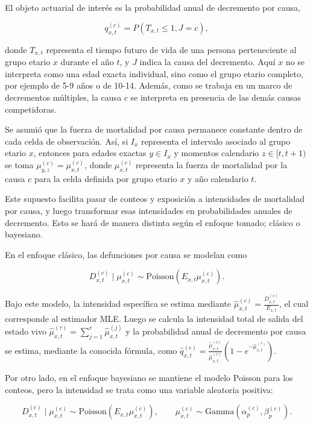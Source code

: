 \documentclass[
  spanish,
  letterpaper,
  DIV=11,
  numbers=noendperiod]{scrartcl}
\begin{document}
El objeto actuarial de interés es la probabilidad anual de decremento
por causa,

\[q_{x,t}^{(c)} = P(T_{x,t}\leq 1, J=c),\]

donde \(T_{x,t}\) representa el tiempo futuro de vida de una persona
perteneciente al grupo etario \(x\) durante el año \(t\), y \(J\) indica
la causa del decremento. Aquí \(x\) no se interpreta como una edad
exacta individual, sino como el grupo etario completo, por ejemplo de
5-9 años o de 10-14. Además, como se trabaja en un marco de decrementos
múltiples, la causa \(c\) se interpreta en presencia de las demás causas
competidoras.

Se asumió que la fuerza de mortalidad por causa permanece constante
dentro de cada celda de observación. Así, si \(I_x\) representa el
intervalo asociado al grupo etario \(x\), entonces para edades exactas
\(y\in I_x\) y momentos calendario \(z\in[t,t+1)\) se toma
\(\mu_{y,z}^{(c)}=\mu_{x,t}^{(c)}\), donde \(\mu_{x,t}^{(c)}\)
representa la fuerza de mortalidad por la causa \(c\) para la celda
definida por grupo etario \(x\) y año calendario \(t\).

Este supuesto facilita pasar de conteos y exposición a intensidades de
mortalidad por causa, y luego transformar esas intensidades en
probabilidades anuales de decremento. Esto se hará de manera distinta
según el enfoque tomado; clásico o bayesiano.

En el enfoque clásico, las defunciones por causa se modelan como

\[D_{x,t}^{(c)}\mid \mu_{x,t}^{(c)}
\sim
\text{Poisson}(E_{x,t}\mu_{x,t}^{(c)}).\]

Bajo este modelo, la intensidad específica se estima mediante
\(\widehat{\mu}_{x,t}^{(c)}=\frac{D_{x,t}^{(c)}}{E_{x,t}}\), el cual
corresponde al estimador MLE. Luego se calcula la intensidad total de
salida del estado vivo
\(\widehat{\mu}_{x,t}^{(\tau)}=\sum_{j=1}^{r}\widehat{\mu}_{x,t}^{(j)}\)
y la probabilidad anual de decremento por causa se estima, mediante la
conocida fórmula, como
\(\widehat{q}_{x,t}^{(c)} = \frac{\widehat{\mu}_{x,t}^{(c)}}{\widehat{\mu}_{x,t}^{(\tau)}} \left(1-e^{-\widehat{\mu}_{x,t}^{(\tau)}}\right).\)

Por otro lado, en el enfoque bayesiano se mantiene el modelo Poisson
para los conteos, pero la intensidad se trata como una variable
aleatoria positiva:

\[D_{x,t}^{(c)}\mid \mu_{x,t}^{(c)}
\sim
\text{Poisson}(E_{x,t}\mu_{x,t}^{(c)}),
\qquad
\mu_{x,t}^{(c)}\sim \text{Gamma}(\alpha_p^{(c)},\beta_p^{(c)}).\]
\end{document}

